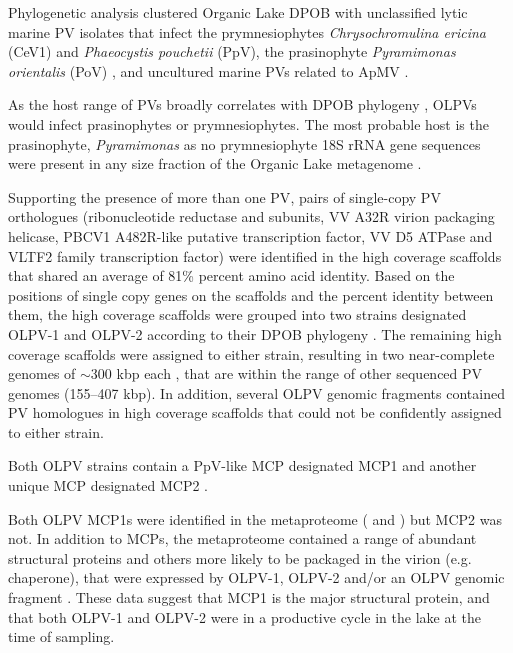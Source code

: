 Phylogenetic analysis clustered Organic Lake \ac{DPOB} with unclassified lytic marine \ac{PV} isolates that infect the prymnesiophytes \emph{Chrysochromulina ericina} (CeV1) and \emph{Phaeocystis pouchetii} (PpV), the prasinophyte \emph{Pyramimonas orientalis} (PoV) \cite{Jacobsen1996, Sandaa2001}, and uncultured marine \acp{PV} related to \ac{ApMV} \cite{Monier2008a, Monier2008b} . 

As the host range of \acp{PV} broadly correlates with \ac{DPOB} phylogeny \cite{Nagasaki2005b, Larsen2008}, \acp{OLPV} would infect prasinophytes or prymnesiophytes. 
The most probable host is the prasinophyte, \emph{Pyramimonas} as no prymnesiophyte 18S \ac{rRNA} gene sequences were present in any size fraction of the Organic Lake metagenome .


Supporting the presence of more than one \ac{PV}, pairs of single-copy \ac{PV} orthologues 
(ribonucleotide reductase \textalpha{} and \textbeta{} subunits, VV A32R virion packaging helicase, \textsc{PBCV1} A482R-like putative transcription factor, VV D5 ATPase and VLTF2 family transcription factor) 
were identified in the high coverage scaffolds that shared an average of 81\% percent amino acid identity.
 Based on the positions of single copy genes on the scaffolds and the percent identity between them, the high coverage scaffolds were grouped into two strains designated \ac{OLPV}-1 and \ac{OLPV}-2 according to their \ac{DPOB} phylogeny .
 The remaining high coverage scaffolds were assigned to either strain, resulting in two near-complete genomes of $\sim$300 kbp each , that are within the range of other sequenced \ac{PV} genomes (155--407 kbp). 
In addition, several \ac{OLPV} genomic fragments contained \ac{PV} homologues in high coverage scaffolds that could not be confidently assigned to either strain. 


Both \ac{OLPV} strains contain a PpV-like \ac{MCP} designated \ac{MCP}1 and another unique \ac{MCP} designated \ac{MCP}2 .

Both \ac{OLPV} \ac{MCP}1s were identified in the metaproteome ( and ) but \ac{MCP}2 was not. 
In addition to \acp{MCP}, the metaproteome contained a range of abundant structural proteins and others more likely to be packaged in the virion (e.g. chaperone), that were expressed by \ac{OLPV}-1, \ac{OLPV}-2 and/or an \ac{OLPV} genomic fragment . 
These data suggest that \ac{MCP}1 is the major structural protein, and that both \ac{OLPV}-1 and \ac{OLPV}-2 were in a productive cycle in the lake at the time of sampling. 


